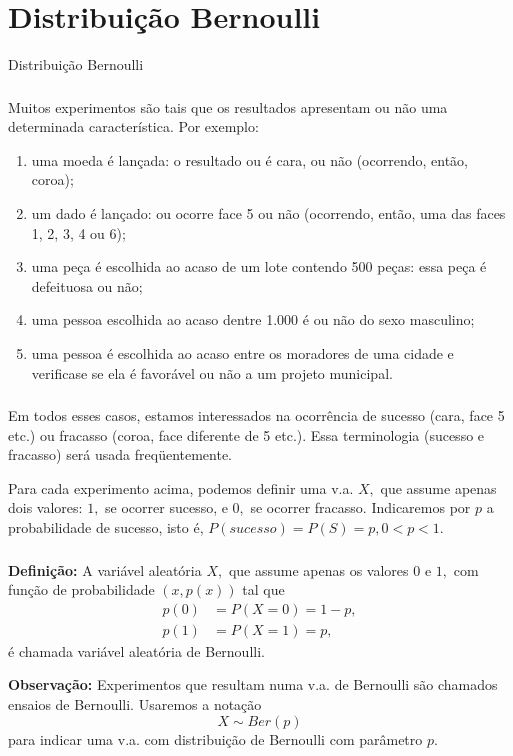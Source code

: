 \documentclass[14pt,aspectratio=1610]{beamer}
\begin{document}
\section{Distribuição Bernoulli}
\begin{frame}{Distribuição Bernoulli}
\frametitle{}
\begin{block}{}
\justifying
Muitos experimentos são tais que os resultados apresentam ou não uma determinada
característica. Por exemplo:
\begin{enumerate}
\item uma moeda é lançada: o resultado ou é cara, ou não (ocorrendo, então, coroa); \pause
\item um dado é lançado: ou ocorre face 5 ou não (ocorrendo, então, uma das faces
1, 2, 3, 4 ou 6);\pause
\item uma peça é escolhida ao acaso de um lote contendo 500 peças: essa peça é
defeituosa ou não;\pause
\item uma pessoa escolhida ao acaso dentre 1.000 é ou não do sexo masculino;\pause
\item uma pessoa é escolhida ao acaso entre os moradores de uma cidade e verificase
se ela é favorável ou não a um projeto municipal.
\end{enumerate}
\end{block}
\end{frame}

\begin{frame}{}
\frametitle{}
\begin{block}{}
\justifying
Em todos esses casos, estamos interessados na ocorrência de sucesso (cara, face 5
etc.) ou fracasso (coroa, face diferente de 5 etc.). Essa terminologia (sucesso e fracasso) será usada freqüentemente.
\end{block}
\pause
\begin{block}{}
\justifying
Para cada experimento acima, podemos definir uma v.a. $X,$ que assume apenas
dois valores: $1,$ se ocorrer sucesso, e $0,$ se ocorrer fracasso. Indicaremos por $p$ a probabilidade de sucesso, isto é, $P(sucesso) = P(S) = p, 0 < p < 1.$
\end{block}
\end{frame}

\begin{frame}{}
\frametitle{}
\begin{block}{}
\justifying
{\bf Definição:} A variável aleatória $X,$ que assume apenas os valores $0$ e $1,$ com função de probabilidade $(x, p(x))$ tal que
\begin{align*}
p(0) &= P(X = 0) = 1 - p,\\
p(1) &= P(X = 1) = p,
\end{align*}
é chamada variável aleatória de Bernoulli.
\end{block}
\pause
\begin{block}{}
\justifying
{\bf Observação:} Experimentos que resultam numa v.a. de Bernoulli são chamados ensaios de Bernoulli. Usaremos a notação $$X\sim Ber(p)$$
para indicar uma v.a. com distribuição de Bernoulli com parâmetro $p.$
\end{block}
\end{frame}
\end{document}
